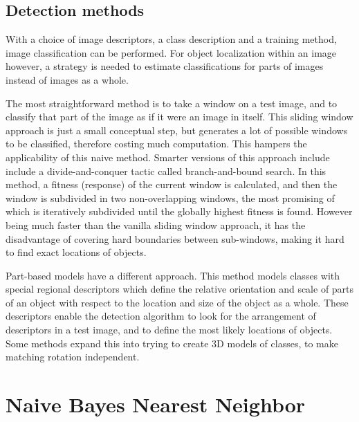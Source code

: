 \documentclass[a4paper,10pt]{article}
\begin{document}
\subsection{Detection methods} %
\label{sub:detection_methods}
With a choice of image descriptors, a class description and a training method, image classification can be performed. For object localization within an image however, a strategy is needed to estimate classifications for parts of images instead of images as a whole.

The most straightforward method is to take a window on a test image, and to classify that part of the image as if it were an image in itself. This sliding window approach  is just a small conceptual step, but generates a lot of possible windows to be classified, therefore costing much computation. This hampers the applicability of this naive method. Smarter versions of this approach include include a divide-and-conquer tactic called branch-and-bound search. \cite{lampert2008beyond} In this method, a fitness (response) of the current window is calculated, and then the window is subdivided in two non-overlapping windows, the most promising of which is iteratively subdivided until the globally highest fitness is found. However being much faster than the vanilla sliding window approach, it has the disadvantage of covering hard boundaries between sub-windows, making it hard to find exact locations of objects.

Part-based models have a different approach. This method models classes with special regional descriptors which define the relative orientation and scale of parts of an object with respect to the location and size of the object as a whole. \cite{leibe2004combined, chum2007exemplar, felzenszwalb2010object} These descriptors enable the detection algorithm to look for the arrangement of descriptors in a test image, and to define the most likely locations of objects. Some methods expand this into trying to create 3D models of classes, to make matching rotation independent. 



\section{Naive Bayes Nearest Neighbor} %
\label{sec:naive_bayes_nearest_neighbor}

\end{document}
